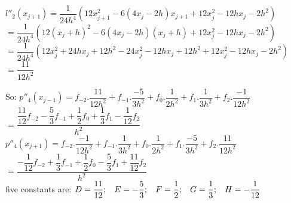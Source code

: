 \documentclass[14pt,a4paper]{article}
\begin{document}
\begin{enumerate}
	$l''_2(x_{j+1}) = \dfrac{1}{24h^4} (12x_{j+1}^2 -6(4x_j-2h)x_{j+1} + 12x_j^2 - 12hx_j -2h^2)$\\
	\hspace*{1.4cm} $ = \dfrac{1}{24h^4} (12(x_j+h)^2 -6(4x_j-2h)(x_j+h) + 12x_j^2 - 12hx_j -2h^2)$\\
	\hspace*{1.4cm} $ = \dfrac{1}{24h^4} (12x_j^2 +24hx_j +12h^2 -24x_j^2 -12hx_j +12h^2 + 12x_j^2 - 12hx_j -2h^2)$\\
	\hspace*{1.4cm} $ = \dfrac{11}{12h^2}$
	\pagebreak
	
	So: \hspace{0.3cm} $p''_4(x_{j-1}) = f_{-2}.\dfrac{11}{12h^2} + f_{-1}.\dfrac{-5}{3h^2} +f_0.\dfrac{1}{2h^2} + f_1.\dfrac{1}{3h^2} + f_2.\dfrac{-1}{12h^2} $\\
	\hspace*{2.7cm} $ = \dfrac{\dfrac{11}{12}f_{-2} - \dfrac{5}{3}f_{-1} + \dfrac{1}{2}f_0 + \dfrac{1}{3}f_1 - \dfrac{1}{12}f_2}{h^2} $\\
	
	\hspace*{1cm} $p''_4(x_{j+1}) = f_{-2}.\dfrac{-1}{12h^2} + f_{-1}.\dfrac{1}{3h^2} +f_0.\dfrac{1}{2h^2} + f_1.\dfrac{-5}{3h^2} + f_2.\dfrac{11}{12h^2} $\\
	\hspace*{2.7cm} $ = \dfrac{-\dfrac{1}{12}f_{-2} + \dfrac{1}{3}f_{-1} + \dfrac{1}{2}f_0 - \dfrac{5}{3}f_1 + \dfrac{11}{12}f_2}{h^2} $\\
	
	five constants are: $ D = \dfrac{11}{12}; \hspace{0.3cm} E = -\dfrac{5}{3}; \hspace{0.3cm} F = \dfrac{1}{2}; \hspace{0.3cm} G = \dfrac{1}{3}; \hspace{0.3cm} H = -\dfrac{1}{12}$\\
	

\end{enumerate}
\end{document}
